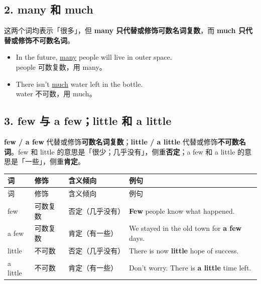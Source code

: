 \documentclass[11pt,a4paper]{ctexart}
\begin{document}
\begin{center}\end{center}

\subsection*{2. many 和 much}

这两个词均表示「很多」，但 \textbf{many 只代替或修饰可数名词复数}，而 \textbf{much 只代替或修饰不可数名词}。

\begin{itemize}[leftmargin=1.4em]
\item In the future, \underline{many} people will live in outer space.\\ people 可数复数，用 many。
\item There isn’t \underline{much} water left in the bottle.\\ water 不可数，用 much。
\end{itemize}

\subsection*{3. few 与 a few；little 和 a little}

\textbf{few / a few} 代替或修饰\textbf{可数名词复数}；\textbf{little / a little} 代替或修饰\textbf{不可数名词}。few 和 little 的意思是「很少；几乎没有」，侧重\textbf{否定}；a few 和 a little 的意思是「一些」，侧重\textbf{肯定}。

{\footnotesize
\begin{longtable}{p{3.35cm}p{3.35cm}p{3.35cm}p{3.35cm}}
\hline
词 & 修饰 & 含义倾向 & 例句 \\
\hline
\endfirsthead
\hline
词 & 修饰 & 含义倾向 & 例句 \\
\hline
\endhead
\hline
\endfoot
few & 可数复数 & 否定（几乎没有） & \textbf{Few} people know what happened. \\
a few & 可数复数 & 肯定（有一些） & We stayed in the old town for \textbf{a few} days. \\
little & 不可数 & 否定（几乎没有） & There is now \textbf{little} hope of success. \\
a little & 不可数 & 肯定（有一些） & Don’t worry. There is \textbf{a little} time left. \\
\end{longtable}
}
\end{document}
